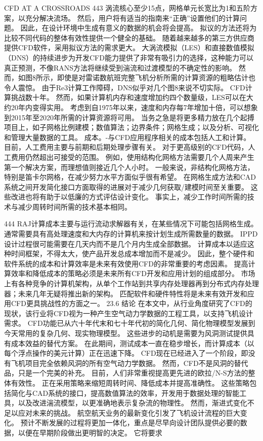 \documentclass[UTF8,11pt,a4paper,openany,fontset=fandol]{ctexbook}
\begin{document}
CFD AT A CROSSROADS 443 涡流核心至少15点，网格单元长宽比为1和五阶方案，以充分解决流场。 然后，用户将有适当的指南来“正确”设置他们的计算问题。 因此，在设计环境中生成有意义的数据的机会将会提高。 拟议的方法还将为比较不同代码的整体有效性提供一个健全的基础。 随着越来越多的第三方供应商提供CFD软件，采用拟议方法的需求更大。 大涡流模拟（LES）和直接数值模拟（DNS）的持续进步为开发CFD能力提供了非常有吸引力的选择，这种能力可以真正预测，不像RANS方法将继续受到湍流和过渡模型的不确定性的影响。 然而，如图8所示，即使是对雷诺数航班完整飞机分析所需的计算资源的粗略估计也令人震惊。 由于Re3计算工作障碍，DNS似乎对几个图8来说不切实际。 CFD计算挑战数十年。 然而，如果计算机内存和速度增加约四个数量级，LES可以在大约20年内变得实用。 考虑到自1975年以来，速度和内存每7年增加十倍，可以想象到2015年至2020年所需的计算资源将可用。 当务之急是将更多精力放在几个起搏项目上，如子网格比例建模；数值算法；边界条件；网格生成；以及分析、可视化和管理大量数据的工具。 成本。-与CFD应用程序相关的成本包括人工和计算。 目前，人工费用主要与前期和后期处理步骤有关。 对于更高级别的CFD代码，人工费用仍然超出可接受的范围。 例如，使用结构化网格方法需要几个人周来产生第一个解决方案，而理想值则接近几个人小时。 一般来说，非结构化网格方法，特别是笛卡尔网格，在减少努力水平方面似乎很有希望。 在网格生成方法和CAD系统之间开发简化接口方面取得的进展对于减少几何获取/建模时间至关重要。 这些改进也将有助于以低廉的方式评估设计变化。 事实上，减少工作时间所需的技术与减少周转时间所需的技术基本相同。

444 RAJ计算成本主要与运行流动求解器有关，在某些情况下可能包括网格生成。 通常需要具有高处理速度和大内存的计算机来按计划生成所需数量的数据。 IPPD设计过程很可能需要在几天内而不是几个月内生成全部数据。 计算成本以适应这种时间框架，不得太大，使产品开发总成本增加而不是减少。 因此，整个硬件和软件系统的成本和计算效率是未来有效使用CFD的非常重要的考虑因素。 提高计算效率和降低成本的策略必须是未来所有CFD开发和应用计划的组成部分。 市场上有各种竞争的计算机架构，从单个工作站到共享内存处理器再到分布式内存处理器；未来几年无疑将推出新的架构。 匹配软件和硬件特性将是未来有效开发和应用CFD更具挑战性的方面之一。 23.6 结论 在本文中，从行业角度研究了CFD的现状，该行业将CFD视为一种产生空气动力学数据的工程工具，以支持飞机设计需求。 CFD功能已从六十年代末和七十年代初的简化几何、简化物理模型发展到今天常用的复杂几何、现实物理模型。 这些进步的动机是需要为风洞测试提供具有成本效益的替代方案。 在此期间，测试成本一直在稳步增长，而计算成本（以每个浮点操作的美元计算）正在迅速下降。 CFD现在已经进入了一个阶段，即没有飞机项目完全依赖风洞的所有空气动力学数据。 然而，CFD不是风洞的替代品，只是一个完美的补充。 目前，人们非常重视提高更先进的欧拉/N-S方法的整体有效性。 正在采用策略来缩短周转时间、降低成本并提高准确性。 这些策略包括简化与CAD系统的接口，提高数值算法的效率，开发用于数据处理的智能工具，以及改进湍流模型，以更准确地表示复杂流的物理性。 然而，渐进式变化不足以应对未来的挑战。 航空航天业务的最新变化引发了飞机设计流程的巨大变化。 预计不断发展的过程将更加一体化，重点是尽早向设计团队提供必要的数据，以便在早期阶段做出更明智的决定。 它将要求
\end{document}
